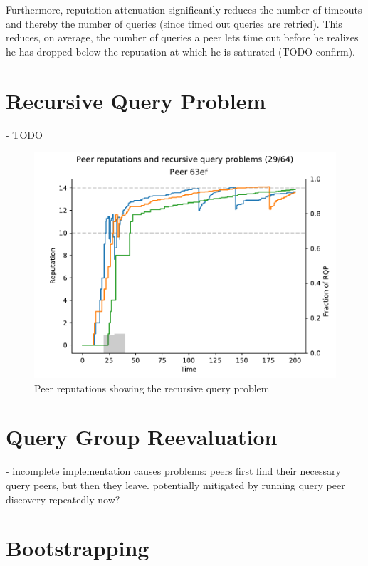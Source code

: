 Furthermore, reputation attenuation significantly reduces the number of timeouts
and thereby the number of queries (since timed out queries are retried). This
reduces, on average, the number of queries a peer lets time out before he
realizes he has dropped below the reputation at which he is saturated (TODO
confirm).

\section{Recursive Query Problem}
\label{sec:rep_avail_rec_query_prob}
- TODO

\begin{figure}[t]
\centering
\includegraphics[width=1\columnwidth]{figures/selection_overlap_rep_sorted_peer_reps_with_rqp_29_of_64}
\caption{Peer reputations showing the recursive query problem}
\label{fig:rec_query_prob}
\end{figure}

\section{Query Group Reevaluation}
\label{sec:rep_avail_group_reeval}
- incomplete implementation causes problems: peers first find their necessary
  query peers, but then they leave. potentially mitigated by running query peer
  discovery repeatedly now?

\section{Bootstrapping}
\label{sec:rep_avail_bootstrapping}
